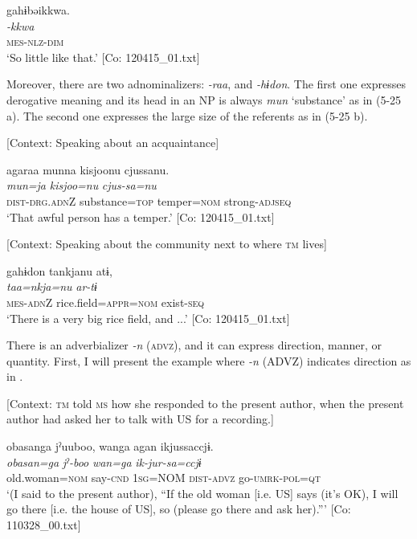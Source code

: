 \glll  gahɨbəikkwa.\\
\textit{-kkwa}\\
\textsc{mes}-\textsc{nlz}-\textsc{dim}\\
\glt ‘So little like that.’ [Co: 120415\_01.txt]
\z
\z

  Moreover, there are two adnominalizers: \textit{{}-raa}, and \textit{{}-hɨdon}. The first one expresses derogative meaning and its head in an NP is always \textit{mun} ‘substance’ as in (5-25 a). The second one expresses the large size of the referents as in (5-25 b).

\ea \label{ex:5:25}  \ea \label{ex:5:25a} [Context: Speaking about an acquaintance]

\glll  agaraa  munna  kisjoonu  cjussanu.\\
\textit{}  \textit{mun=ja}  \textit{kisjoo=nu}  \textit{cjus-sa=nu}\\
\textsc{dist}-\textsc{drg}.\textsc{adn}Z  substance=\textsc{top}  temper=\textsc{nom}  strong-\textsc{adj}\textsc{seq}\\
\glt ‘That awful person has a temper.’ [Co: 120415\_01.txt]

 \ex \label{ex:5:b} [Context: Speaking about the community next to where \textsc{tm} lives]

\glll  gahɨdon  tankjanu  atɨ,\\
\textit{}  \textit{taa=nkja=nu}  \textit{ar-tɨ}\\
\textsc{mes}-\textsc{adn}Z  rice.field=\textsc{appr}=\textsc{nom}  exist-\textsc{seq}\\
\glt ‘There is a very big rice field, and ...’ [Co: 120415\_01.txt]
\z
\z

  There is an adverbializer \textit{-n} (\textsc{advz}), and it can express direction, manner, or quantity. First, I will present the example where \textit{{}-n} (ADVZ) indicates direction as in .

\ea \label{ex:5:26}   [Context: \textsc{tm} told \textsc{ms} how she responded to the present author, when the present author had asked her to talk with US for a recording.]

\glll  {\textbar}obasan{\textbar}ga  jˀuuboo,  wanga  agan  ikjussaccjɨ.\\
\textit{obasan=ga}  \textit{jˀ-boo}  \textit{wan=ga}  \textit{}  \textit{ik-jur-sa=ccjɨ}\\
old.woman=\textsc{nom}  say-\textsc{cnd}  1\textsc{sg}=NOM  \textsc{dist}-\textsc{advz}  go-\textsc{umrk}-\textsc{pol}=\textsc{qt}\\
\glt ‘(I said to the present author), “If the old woman [i.e. US] says (it’s OK), I will go there [i.e. the house of US], so (please go there and ask her).”’ [Co: 110328\_00.txt]
\z

